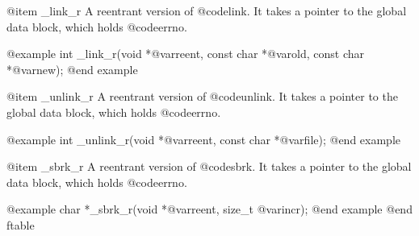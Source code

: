 @item _link_r
A reentrant version of @code{link}.  It takes a pointer to the global
data block, which holds @code{errno}.

@example
int _link_r(void *@var{reent},
    const char *@var{old}, const char *@var{new});
@end example

@item _unlink_r
A reentrant version of @code{unlink}.  It takes a pointer to the global
data block, which holds @code{errno}.

@example
int _unlink_r(void *@var{reent}, const char *@var{file});
@end example

@item _sbrk_r
A reentrant version of @code{sbrk}.  It takes a pointer to the global
data block, which holds @code{errno}.

@example
char *_sbrk_r(void *@var{reent}, size_t @var{incr});
@end example
@end ftable
